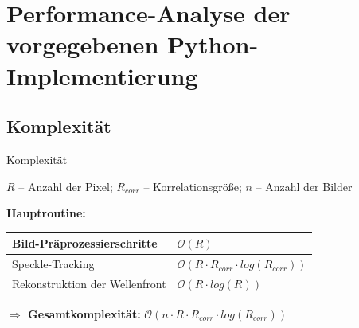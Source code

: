 
\section{Performance-Analyse der vorgegebenen Python-Implementierung}

\subsection{Komplexität}
\begin{frame}{Komplexität}
	\begin{center}
		$ R $ -- Anzahl der Pixel; $ R_{corr} $ -- Korrelationsgröße; $ n $ -- Anzahl der Bilder \\
	\end{center}
	\textbf{Hauptroutine:} \\
	\setlength\extrarowheight{5pt}
	\begin{center}
		\begin{tabular}{| >{\centering\arraybackslash}m{4cm} | >{\centering\arraybackslash}m{5cm} |}
			\hline
			Bild-Präprozessierschritte & $ \mathcal{O}(R) $ \\ \hline
			Speckle-Tracking & $ \mathcal{O}\left(R \cdot R_{corr} \cdot log\left(R_{corr}\right)\right)$ \\ \hline
			Rekonstruktion der Wellenfront & $ \mathcal{O}(R \cdot log(R)) $ \\ \hline
		\end{tabular}
	\end{center}
	\vspace{.5cm}
	\textbf{$ \Rightarrow $ Gesamtkomplexität:} $ \mathcal{O}\left(n \cdot R \cdot R_{corr} \cdot log\left(R_{corr}\right)\right)$
\end{frame}

